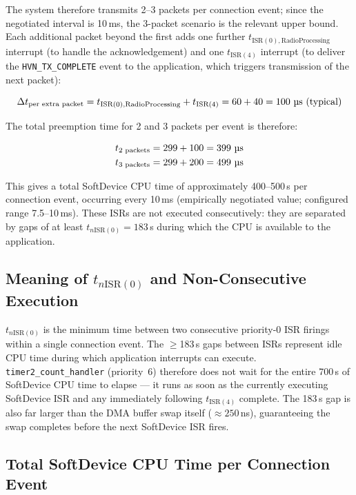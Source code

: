 The system therefore transmits 2--3 packets per connection event; since the
negotiated interval is 10\,ms, the 3-packet scenario is the relevant upper bound. Each 
additional packet beyond the first adds one further 
$t_{\text{ISR}(0),\text{RadioProcessing}}$ interrupt (to handle the 
acknowledgement) and one $t_{\text{ISR}(4)}$ interrupt (to deliver the 
\texttt{HVN\_TX\_COMPLETE} event to the application, which triggers 
transmission of the next packet):

\begin{equation}
\Delta t_{\text{per extra packet}} = 
t_{\text{ISR}(0),\text{RadioProcessing}} + t_{\text{ISR}(4)} = 
60 + 40 = 100~\text{\textmu s (typical)}
\end{equation}

The total preemption time for 2 and 3 packets per event is therefore:

\begin{align}
t_{\text{2 packets}} &= 299 + 100 = 399~\text{\textmu s} \\
t_{\text{3 packets}} &= 299 + 200 = 499~\text{\textmu s}
\end{align}

This gives a total SoftDevice CPU time of approximately 400--500\,\textmu{}s per
connection event, occurring every 10\,ms (empirically negotiated value; configured
range 7.5--10\,ms). These ISRs are not executed consecutively: they are separated
by gaps of at least $t_{n\text{ISR}(0)} = 183$\,\textmu{}s during which the CPU
is available to the application.

\subsection*{Meaning of $t_{n\text{ISR}(0)}$ and Non-Consecutive Execution}

$t_{n\text{ISR}(0)}$ is the minimum time between two consecutive priority-0 ISR
firings within a single connection event. The $\geq$183\,\textmu{}s gaps between
ISRs represent idle CPU time during which application interrupts can execute.
\texttt{timer2\_count\_handler} (priority~6) therefore does not wait for the
entire 700\,\textmu{}s of SoftDevice CPU time to elapse --- it runs as soon as
the currently executing SoftDevice ISR and any immediately following
$t_{\text{ISR}(4)}$ complete. The 183\,\textmu{}s gap is also far larger than
the DMA buffer swap itself ($\approx 250$\,ns), guaranteeing the swap completes
before the next SoftDevice ISR fires.

\subsection*{Total SoftDevice CPU Time per Connection Event}

